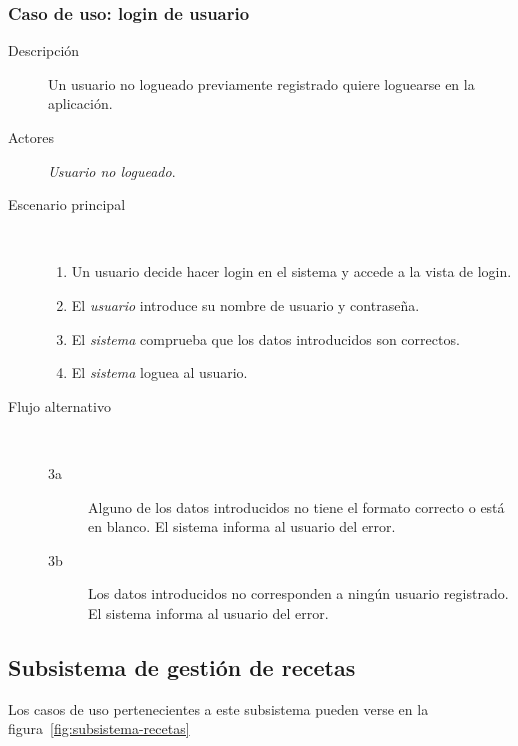 \subsubsection{Caso de uso: login de usuario}

\begin{description}
\item[Descripción] Un usuario no logueado previamente registrado quiere loguearse
en la aplicación.
\item[Actores] \textit{Usuario no logueado}.
\item[Escenario principal] $\quad$
  \begin{enumerate}
  \item Un usuario decide hacer login en el sistema y accede a la vista de login.
  \item El \textit{usuario} introduce su nombre de usuario y contraseña.
  \item El \textit{sistema} comprueba que los datos introducidos son correctos.
  \item El \textit{sistema} loguea al usuario.
  \end{enumerate}
\item[Flujo alternativo] $\quad$
  \begin{description}
  \item[3a] Alguno de los datos introducidos no tiene el formato correcto o está
    en blanco. El sistema informa al usuario del error.
  \item[3b] Los datos introducidos no corresponden a ningún usuario registrado.
  El sistema informa al usuario del error.
  \end{description}
\end{description}



\subsection{Subsistema de gestión de recetas}

Los casos de uso pertenecientes a este subsistema pueden verse en la
figura~\ref{fig:subsistema-recetas}


